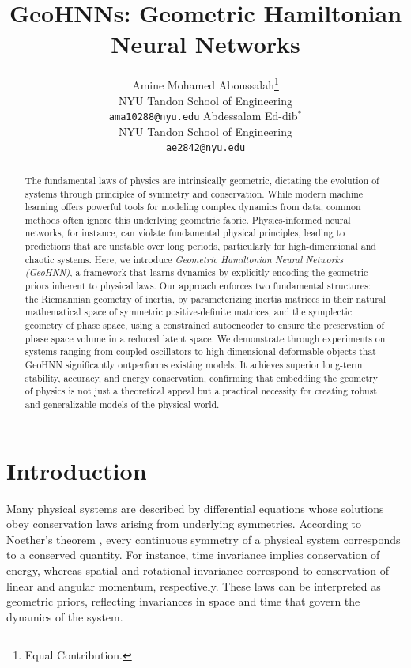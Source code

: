 \documentclass{article}
\title{GeoHNNs: Geometric Hamiltonian Neural Networks}
\author{
Amine Mohamed Aboussalah\thanks{Equal Contribution.} \\
NYU Tandon School of Engineering \\
\texttt{ama10288@nyu.edu}
    \And
Abdessalam Ed-dib$^*$
\\
NYU Tandon School of Engineering 
\\
\texttt{ae2842@nyu.edu}
}
\theoremstyle{plain}
\theoremstyle{definition}
\theoremstyle{remark}
\begin{document}
\maketitle
\begin{abstract}
The fundamental laws of physics are intrinsically geometric, dictating the evolution of systems through principles of symmetry and conservation. While modern machine learning offers powerful tools for modeling complex dynamics from data, common methods often ignore this underlying geometric fabric. Physics-informed neural networks, for instance, can violate fundamental physical principles, leading to predictions that are unstable over long periods, particularly for high-dimensional and chaotic systems. Here, we introduce \textit{Geometric Hamiltonian Neural Networks (GeoHNN)}, a framework that learns dynamics by explicitly encoding the geometric priors inherent to physical laws. Our approach enforces two fundamental structures: the Riemannian geometry of inertia, by parameterizing inertia matrices in their natural mathematical space of symmetric positive-definite matrices, and the symplectic geometry of phase space, using a constrained autoencoder to ensure the preservation of phase space volume in a reduced latent space. We demonstrate through experiments on systems ranging from coupled oscillators to high-dimensional deformable objects that GeoHNN significantly outperforms existing models. It achieves superior long-term stability, accuracy, and energy conservation, confirming that embedding the geometry of physics is not just a theoretical appeal but a practical necessity for creating robust and generalizable models of the physical world.
\end{abstract}
\section{Introduction}

Many physical systems are described by differential equations whose solutions obey conservation laws arising from underlying symmetries. According to Noether’s theorem \cite{Noether1918}, every continuous symmetry of a physical system corresponds to a conserved quantity. For instance, time invariance implies conservation of energy, whereas spatial and rotational invariance correspond to conservation of linear and angular momentum, respectively. These laws can be interpreted as geometric priors, reflecting invariances in space and time that govern the dynamics of the system.
\end{document}
